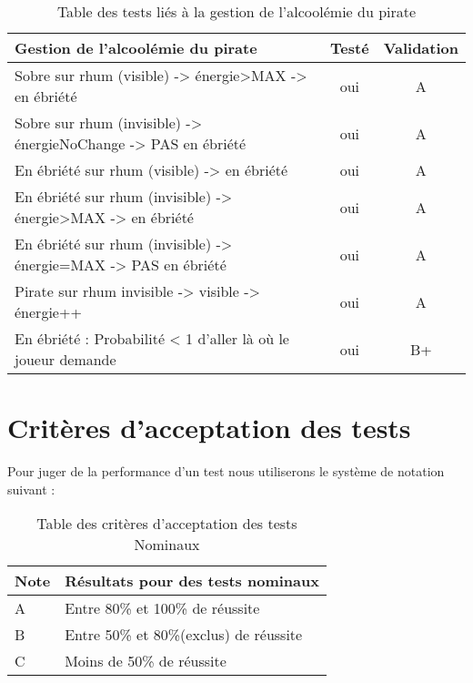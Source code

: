 \begin{table}[!h]
\begin{center}
\begin{tabular}{|p{10cm}|c|c|}
\hline
\textbf{Gestion de l’alcoolémie du pirate} & \textbf{Testé} & \textbf{Validation} \\\hline
Sobre sur rhum (visible) -> énergie>MAX -> en ébriété				& oui & A \\\hline
Sobre sur rhum (invisible) -> énergieNoChange -> PAS en ébriété		& oui & A \\\hline
En ébriété sur rhum (visible) -> en ébriété							& oui & A \\\hline
En ébriété sur rhum (invisible) -> énergie>MAX -> en ébriété		& oui & A \\\hline
En ébriété sur rhum (invisible) -> énergie=MAX -> PAS en ébriété	& oui & A \\\hline
Pirate sur rhum invisible -> visible -> énergie++					& oui & A \\\hline
En ébriété : Probabilité < 1 d'aller là où le joueur demande			& oui & B+ \\\hline
\end{tabular}
\end{center}
\caption{Table des tests liés à la gestion de l’alcoolémie du pirate}
\end{table}

\newpage
		
	\section{Critères d'acceptation des tests}
	
Pour juger de la performance d’un test nous utiliserons le système de notation suivant :

\begin{table}[!h]
\begin{center}	
\begin{tabular}{|p{2cm}|p{9cm}|}
\hline
\textbf{Note} & \textbf{Résultats pour des tests nominaux}\\
\hline
A & Entre 80\% et 100\% de réussite\\
\hline
B & Entre 50\% et 80\%(exclus) de réussite\\
\hline
C & Moins de 50\% de réussite\\
\hline
\end{tabular}
\end{center}
\caption{Table des critères d'acceptation des tests Nominaux}
\end{table}